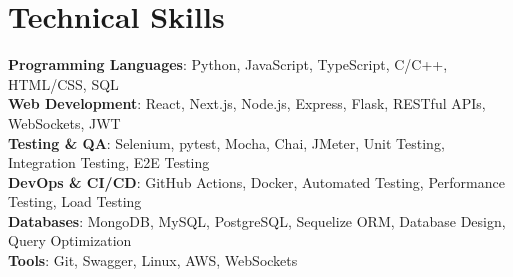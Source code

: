 \documentclass[letterpaper,11pt]{article}
\begin{document}
\section{Technical Skills}
 \begin{itemize}[leftmargin=0.15in, label={}]
    \small{\item{
     \textbf{Programming Languages}{: Python, JavaScript, TypeScript, C/C++, HTML/CSS, SQL} \\
     \textbf{Web Development}{: React, Next.js, Node.js, Express, Flask, RESTful APIs, WebSockets, JWT} \\
     \textbf{Testing \& QA}{: Selenium, pytest, Mocha, Chai, JMeter, Unit Testing, Integration Testing, E2E Testing} \\
     \textbf{DevOps \& CI/CD}{: GitHub Actions, Docker, Automated Testing, Performance Testing, Load Testing} \\
     \textbf{Databases}{: MongoDB, MySQL, PostgreSQL, Sequelize ORM, Database Design, Query Optimization} \\
     \textbf{Tools}{: Git, Swagger, Linux, AWS, WebSockets}
    }}
 \end{itemize}
\end{document}
